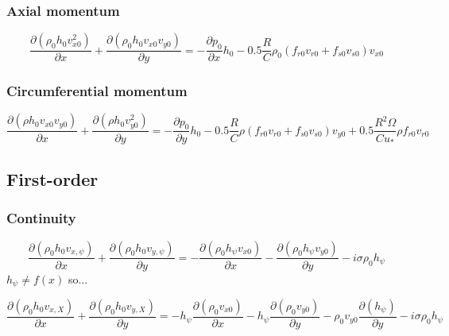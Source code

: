 \documentclass[12pt,letterpaper]{article}
\begin{document}
\subsubsection{Axial momentum}

\begin{dmath}
\frac{\partial \left( \rho_0 h_0 v_{x0}^2 \right)}{\partial x} +
\frac{\partial \left( \rho_0 h_0 v_{x0} v_{y0} \right)}{\partial y} =
- \frac{\partial p_0 }{\partial x } h_0 - 
0.5 \frac{R}{C} \rho_0 \left( f_{r0} v_{r0} + f_{s0} v_{s0} \right) v_{x0}
\end{dmath}

\subsubsection{Circumferential momentum}

\begin{dmath}
\frac{\partial \left( \rho h_0 v_{x0} v_{y0} \right)}{\partial x} +
\frac{\partial \left( \rho h_0 v_{y0}^2 \right)}{\partial y} =
- \frac{\partial p_0 }{\partial y } h_0 - 
0.5 \frac{R}{C} \rho \left( f_{r0} v_{r0} + f_{s0} v_{s0} \right) v_{y0} +
0.5 \frac{R^2 \Omega}{C u_*} \rho f_{r0} v_{r0}
\end{dmath}


\subsection{First-order}

\subsubsection{Continuity}

\begin{dmath}
  \frac{\partial \left( \rho_0 h_0 v_{x,\psi} \right)}{\partial x}
+ \frac{\partial \left( \rho_0 h_0 v_{y,\psi} \right)}{\partial y}
= 
- \frac{\partial \left( \rho_0 h_{\psi} v_{x0} \right)}{\partial x}
- \frac{\partial \left( \rho_0 h_{\psi} v_{y0} \right)}{\partial y}
- i \sigma \rho_0 h_{\psi}
\end{dmath}
%
$h_{\psi} \neq f(x)$ so... 

\begin{dmath}
  \frac{\partial \left( \rho_0 h_0 v_{x,X} \right)}{\partial x}
+ \frac{\partial \left( \rho_0 h_0 v_{y,X} \right)}{\partial y}
= 
- h_{\psi} \frac{\partial \left( \rho_0  v_{x0} \right)}{\partial x}
- h_{\psi} \frac{\partial \left( \rho_0  v_{y0} \right)}{\partial y}
- \rho_0 v_{y0} \frac{\partial \left( h_{\psi} \right)}{\partial y}
- i \sigma \rho_0 h_{\psi}
\end{dmath}
\end{document}
